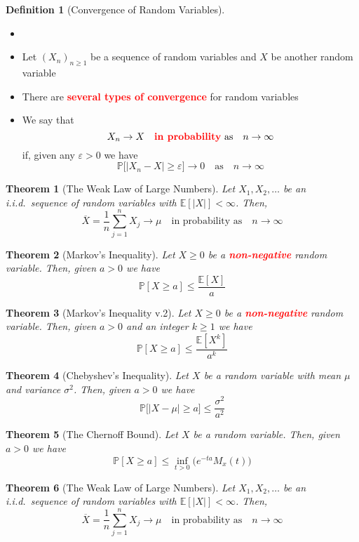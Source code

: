 \documentclass{article}
\newcommand{\PP}{\mathbb{P}}
\newcommand{\E}{\mathbb{E}}
\newcommand{\bfred}[1]{\textcolor{red}{\textbf{#1}}}
\theoremstyle{plain}
\newtheorem{thm}{Theorem}[section]
\theoremstyle{definition}
\newtheorem{defn}{Definition}[section]
\theoremstyle{remark}
\begin{document}
\begin{defn}[Convergence of Random Variables]
    \begin{itemize}
        \item []
        \item Let $(X_n)_{n\geq1}$ be a sequence of random variables and $X$ be another random variable 
        \item There are \bfred{several types of convergence} for random variables
        \item We say that \[X_n\rightarrow X \quad \text{\bfred{in probability} as} \quad n\rightarrow\infty\] if, given any $\varepsilon>0$ we have \[\PP\bigr[|X_n-X|\geq\varepsilon\bigr]\rightarrow 0 \quad \text{as} \quad n\rightarrow\infty\]
    \end{itemize}
\end{defn}

\begin{thm}[The Weak Law of Large Numbers]
    Let $X_1,X_2,\dotsc$ be an i.i.d.\ sequence of random variables with $\E[|X|]<\infty$. Then, \[\overline{X}=\frac{1}{n}\sum_{j=1}^nX_j\rightarrow\mu\quad \text{in probability as} \quad n\rightarrow\infty\]
\end{thm}

\begin{thm}[Markov's Inequality]
    Let $X\geq0$ be a \bfred{non-negative} random variable. Then, given $a>0$ we have \[\PP[X\geq a]\leq\frac{\E[X]}{a}\]
\end{thm}

\begin{thm}[Markov's Inequality v.2]
    Let $X\geq0$ be a \bfred{non-negative} random variable. Then, given $a>0$ and an integer $k\geq 1$ we have \[\PP[X\geq a]\leq\frac{\E[X^k]}{a^k}\]
\end{thm}

\begin{thm}[Chebyshev's Inequality]
    Let $X$ be a random variable with mean $\mu$ and variance $\sigma^2$. Then, given $a>0$ we have \[\PP\bigr[|X-\mu|\geq a\bigr]\leq\frac{\sigma^2}{a^2}\]
\end{thm}

\begin{thm}[The Chernoff Bound]
    Let $X$ be a random variable. Then, given $a>0$ we have \[\PP[X\geq a]\leq\inf_{t>0}\bigr(e^{-ta}M_x(t)\bigr)\]
\end{thm}

\begin{thm}[The Weak Law of Large Numbers]
    Let $X_1,X_2,\dotsc$ be an i.i.d.\ sequence of random variables with $\E[|X|]<\infty$. Then, \[\overline{X}=\frac{1}{n}\sum_{j=1}^nX_j\rightarrow\mu\quad\text{in probability as}\quad n\rightarrow\infty\]
\end{thm}
\end{document}
